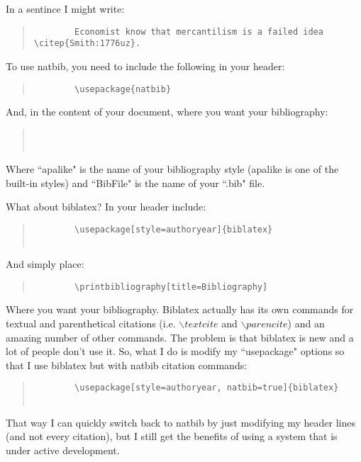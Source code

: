 In a sentince I might write:

\begin{quote}
	\begin{verbatim}
		Economist know that mercantilism is a failed idea \citep{Smith:1776uz}.
	\end{verbatim}
\end{quote}

To use natbib, you need to include the following in your header:

\begin{quote}
	\begin{verbatim}
		\usepackage{natbib}
	\end{verbatim}
\end{quote}

And, in the content of your document, where you want your bibliography:

\begin{quote}
	\begin{verbatim}
		
		
	\end{verbatim}
\end{quote}

Where ``apalike" is the name of your bibliography style (apalike is one of the built-in styles) and ``BibFile" is the name of your ``.bib" file.
 
What about biblatex? In your header include:

\begin{quote}
	\begin{verbatim}
		\usepackage[style=authoryear]{biblatex}
		
	\end{verbatim}
\end{quote}

And simply place:

\begin{quote}
	\begin{verbatim}
		\printbibliography[title=Bibliography]
	\end{verbatim}
\end{quote}

Where you want your bibliography.  Biblatex actually has its own commands for textual and parenthetical citations (i.e. $\backslash textcite$ and $\backslash parencite$) and an amazing number of other commands.  The problem is that biblatex is new and a lot of people don't use it.  So, what I do is modify my ``usepackage" options so that I use biblatex but with natbib citation commands:

\begin{quote}
	\begin{verbatim}
		\usepackage[style=authoryear, natbib=true]{biblatex}
		
	\end{verbatim}
\end{quote}

That way I can quickly switch back to natbib by just modifying my header lines (and not every citation), but I still get the benefits of using a system that is under active development.